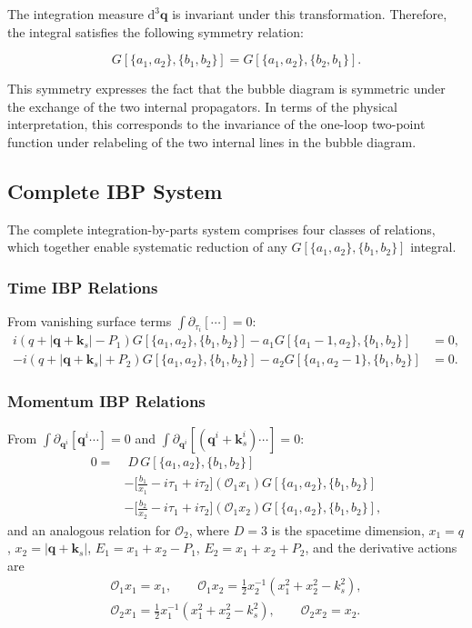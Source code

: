 \documentclass[a4paper,12pt]{article}
\def\di{{\mathrm{d}}}
\def\pd{\partial}
\begin{document}
The integration measure $\di^3\bm q$ is invariant under this transformation. Therefore, the integral satisfies the following symmetry relation:

\begin{equation}
	G[\{a_1,a_2\},\{b_1,b_2\}] = G[\{a_1,a_2\},\{b_2,b_1\}].
\end{equation}

This symmetry expresses the fact that the bubble diagram is symmetric under the exchange of the two internal propagators. In terms of the physical interpretation, this corresponds to the invariance of the one-loop two-point function under relabeling of the two internal lines in the bubble diagram.






\subsection{Complete IBP System}

The complete integration-by-parts system comprises four classes of relations, which together enable systematic reduction of any $G[\{a_1,a_2\},\{b_1,b_2\}]$ integral.

\subsubsection{Time IBP Relations}
From vanishing surface terms $\int \pd_{\tau_i}[\cdots]=0$:
\begin{align}
	i(q+|\bm q+\bm k_s|-P_1) G[\{a_1,a_2\},\{b_1,b_2\}] - a_1 G[\{a_1-1,a_2\},\{b_1,b_2\}]  & =0, \\
	-i(q+|\bm q+\bm k_s|+P_2) G[\{a_1,a_2\},\{b_1,b_2\}] - a_2 G[\{a_1,a_2-1\},\{b_1,b_2\}] & =0.
\end{align}

\subsubsection{Momentum IBP Relations}
From $\int \pd_{\bm q^i}[\bm q^i \cdots]=0$ and $\int \pd_{\bm q^i}[(\bm q^i+\bm k_s^i) \cdots]=0$:
\begin{align}
	0 = & \; D\, G[\{a_1,a_2\},\{b_1,b_2\}] \nonumber        \\
	    & - \Big[ \frac{b_1}{x_1} - i\tau_1 + i\tau_2 \Big]
	(\mathcal{O}_1 x_1) G[\{a_1,a_2\},\{b_1,b_2\}] \nonumber \\
	    & - \Big[ \frac{b_2}{x_2} - i\tau_1 + i\tau_2 \Big]
	(\mathcal{O}_1 x_2) G[\{a_1,a_2\},\{b_1,b_2\}],
\end{align}
and an analogous relation for $\mathcal{O}_2$, where $D=3$ is the spacetime dimension, $x_1=q$, $x_2=|\bm q+\bm k_s|$, $E_1=x_1+x_2-P_1$, $E_2=x_1+x_2+P_2$, and the derivative actions are
\begin{align*}
	\mathcal{O}_1 x_1 = x_1, \qquad \mathcal{O}_1 x_2 = \frac{1}{2}x_2^{-1}(x_1^2+x_2^2-k_s^2), \\
	\mathcal{O}_2 x_1 = \frac{1}{2}x_1^{-1}(x_1^2+x_2^2-k_s^2), \qquad \mathcal{O}_2 x_2 = x_2.
\end{align*}
\end{document}
